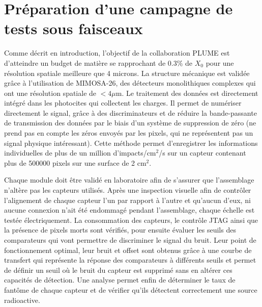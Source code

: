 \documentclass[a4papper, 10pt]{article}
\begin{document}
  \section{Préparation d'une campagne de tests sous faisceaux}

  Comme décrit en introduction, l'objectif de la collaboration PLUME est d'atteindre un budget de matière se rapprochant de 0.3\% de $X_0$ pour une résolution spatiale meilleure que 4 microns.
  La structure mécanique est validée grâce à l'utilisation de MIMOSA-26, des détecteurs monolithiques complexes qui ont une résolution spatiale de $< 4 \mu$m.
  Le traitement des données est directement intégré dans les photocites qui collectent les charges. 
  Il permet de numériser directement le signal, grâce à des discriminateurs et de réduire la bande-passante de transmission des données par le biais d'un système de suppression de zéro (ne prend pas en compte les zéros envoyés par les pixels, qui ne représentent pas un signal physique intéressant).
  Cette méthode permet d'enregistrer les informations individuelles de plus de un million d'impacts/cm$^2$/s sur un capteur contenant plus de 500000 pixels sur une surface de 2 cm$^2$.

  Chaque module doit être validé en laboratoire afin de s'assurer que l'assemblage n'altère pas les capteurs utilisés.
  Après une inspection visuelle afin de contrôler l'alignement de chaque capteur l'un par rapport à l'autre et qu'aucun d'eux, ni aucune connexion n'ait été endommagé pendant l'assemblage, chaque échelle est testée électriquement.
  La consommation des capteurs, le contrôle JTAG ainsi que la présence de pixels morts sont vérifiés, pour ensuite évaluer les seuils des comparateurs qui vont permettre de discriminer le signal du bruit.
  Leur point de fonctionnement optimal, leur bruit et offset sont obtenus grâce à une courbe de transfert qui représente la réponse des comparateurs à différents seuils et permet de définir un seuil où le bruit du capteur est supprimé sans en altérer ces capacités de détection.
  Une analyse permet enfin de déterminer le taux de fantôme de chaque capteur et de vérifier qu'ils détectent correctement une source radioactive.
  
\end{document}

